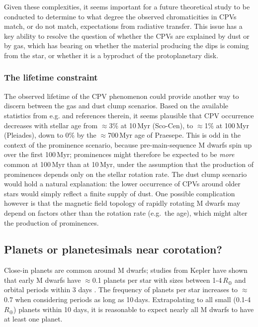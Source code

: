 \documentclass[11pt,twocolumn,tighten]{aastex63}
\begin{document}
Given these complexities, it seems important for a future theoretical
study to be conducted to determine to what degree the observed
chromaticities in CPVs match, or do not match, expectations from
radiative transfer.  This issue has a key ability to resolve the
question of whether the CPVs are explained by dust or by gas, which
has bearing on whether the material producing the dips is coming from
the star, or whether it is a byproduct of the protoplanetary disk.



\subsubsection{The lifetime constraint}

The observed lifetime of the CPV phenomenon could provide another way
to discern between the gas and dust clump scenarios.  Based on the
available statistics from e.g.  \citet{2022AJ....164...80R} and
references therein, it seems plausible that CPV occurrence decreases
with stellar age from $\approx$3\% at 10\,Myr (Sco-Cen), to
$\approx$1\% at 100\,Myr (Pleiades), down to 0\% by the
$\approx$700\,Myr age of Praesepe.  This is odd in the context of the
prominence scenario, because pre-main-sequence M dwarfs spin up over
the first 100\,Myr; prominences might therefore be expected to be {\it
more} common at 100\,Myr than at 10\,Myr, under the assumption that
the production of prominences depends only on the stellar rotation
rate.  The dust clump scenario would hold a natural explanation: the
lower occurrence of CPVs around older stars would simply reflect a
finite supply of dust.  One possible complication however is that the
magnetic field topology of rapidly rotating M dwarfs may depend on
factors other than the rotation rate (e.g.\ the age), which might
alter the production of prominences.


\subsection{Planets or planetesimals near corotation?}

Close-in planets are common around M dwarfs; studies from Kepler have
shown that early M dwarfs have $\approx$0.1 planets per star with
sizes between 1-4\,$R_\oplus$ and orbital periods within 3 days
\citep{2015ApJ...807...45D}.  The frequency of planets per star
increases to $\approx$0.7 when considering periods as long as
10\,days.  Extrapolating to all small (0.1-4\,$R_\oplus$) planets
within 10 days, it is reasonable to expect nearly all M dwarfs to have
at least one planet.
\end{document}
